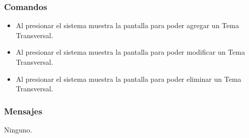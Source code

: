 \subsubsection{Comandos}
\begin{itemize}
 \item Al presionar  el sistema muestra la pantalla  para poder agregar un Tema Transversal.
 \item Al presionar  el sistema muestra la pantalla  para poder modificar un Tema Transversal.
 \item Al presionar  el sistema muestra la pantalla  para poder eliminar un Tema Transversal.

\end{itemize}

\subsubsection{Mensajes}
  Ninguno.


